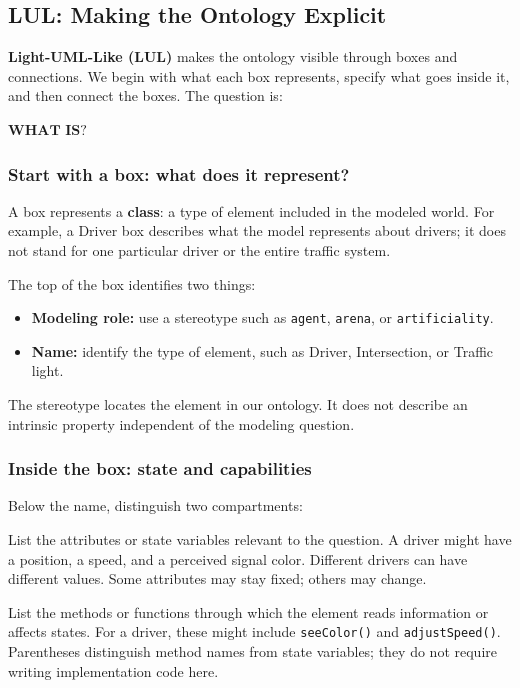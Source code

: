 \documentclass[11pt,a4paper]{article}
\newcommand{\stereo}[1]{\texttt{\guillemotleft #1\guillemotright}}
\newenvironment{fitdisplay}{\par\medskip\noindent\begin{lrbox}{\displaybox}$\displaystyle}{%
$\end{lrbox}\makebox[\linewidth][c]{\ifdim\wd\displaybox>\linewidth\resizebox{\linewidth}{!}{\usebox{\displaybox}}\else\usebox{\displaybox}\fi}\par\medskip}
\begin{document}
\subsection{LUL: Making the Ontology Explicit}

\textbf{Light-UML-Like (LUL)} makes the ontology visible through boxes and connections. We begin with what each box represents, specify what goes inside it, and then connect the boxes. The question is:

\begin{fitdisplay}
\boxed{\textbf{WHAT IS?}}
\end{fitdisplay}

\subsubsection{Start with a box: what does it represent?}

A box represents a \textbf{class}: a type of element included in the modeled world. For example, a Driver box describes what the model represents about drivers; it does not stand for one particular driver or the entire traffic system.

The top of the box identifies two things:
\begin{itemize}
\item \textbf{Modeling role:} use a stereotype such as \stereo{agent}, \stereo{arena}, or \stereo{artificiality}.
\item \textbf{Name:} identify the type of element, such as Driver, Intersection, or Traffic light.
\end{itemize}
The stereotype locates the element in our ontology. It does not describe an intrinsic property independent of the modeling question.

\subsubsection{Inside the box: state and capabilities}

Below the name, distinguish two compartments:
\begin{description}[style=nextline,leftmargin=0pt,itemsep=5pt]
\item[State: what can be described about the element?] List the attributes or state variables relevant to the question. A driver might have a position, a speed, and a perceived signal color. Different drivers can have different values. Some attributes may stay fixed; others may change.
\item[Capabilities: what can the element do?] List the methods or functions through which the element reads information or affects states. For a driver, these might include \texttt{seeColor()} and \texttt{adjustSpeed()}. Parentheses distinguish method names from state variables; they do not require writing implementation code here.
\end{description}
\end{document}
